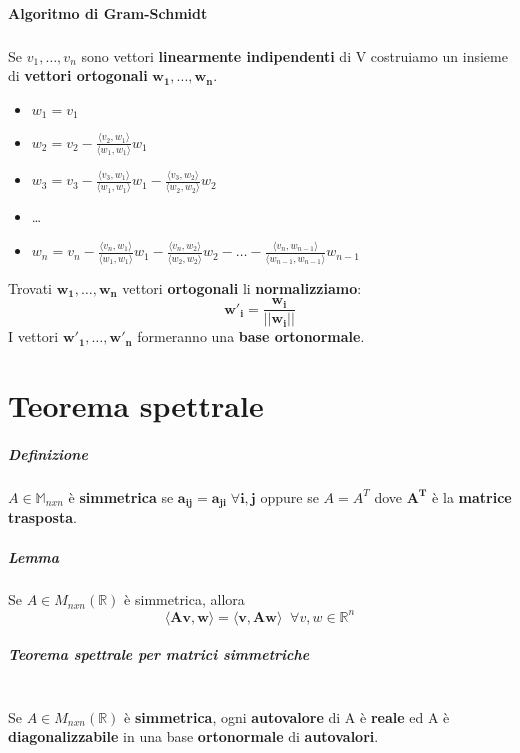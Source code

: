 \documentclass[a4paper, 12pt]{report}
\begin{document}
        \subsubsection{Algoritmo di Gram-Schmidt}
        \paragraph{}Se $v_1,\dots,v_n$ sono vettori \textbf{linearmente indipendenti} di V costruiamo un insieme di \textbf{vettori ortogonali} $\boldsymbol{w_1,...
        ,w_n}$.
        \begin{itemize}
            \item $w_1=v_1$
            \item $w_2=v_2-\frac{\langle v_2,w_1\rangle}{\langle w_1,w_1 \rangle}w_1$
            \item $w_3=v_3-\frac{\langle v_3,w_1\rangle}{\langle w_1,w_1 \rangle}w_1-\frac{\langle v_3,w_2\rangle}{\langle w_2,w_2 \rangle}w_2$
            \item \dots
            \item $w_n=v_n-\frac{\langle v_n,w_1\rangle}{\langle w_1,w_1\rangle}w_1-\frac{\langle v_n,w_2\rangle}{\langle w_2,w_2\rangle}w_2-\dots-\frac{\langle v_{n},w_{n-1}\rangle}{\langle w_{n-1},w_{n-1}\rangle}w_{n-1}$
        \end{itemize}
        Trovati $\boldsymbol{w_1,\dots,w_n}$ vettori \textbf{ortogonali} li \textbf{normalizziamo}:
        $$\boldsymbol{w'_i=\frac{w_i}{||w_i||}}$$
        I vettori $\boldsymbol{w'_1,\dots,w'_n}$ formeranno una \textbf{base ortonormale}.
    \chapter{Teorema spettrale}
        \paragraph{Definizione} $A \in \mathbb{M}_{nxn}$ è \textbf{simmetrica} se $\boldsymbol{a_{ij}=a_{ji} \; \forall i,j}$ oppure se $A=A^T$ dove $\boldsymbol{A^T}$ è la \textbf{matrice trasposta}.
        \paragraph{Lemma} Se $A \in M_{nxn}(\mathbb{R})$ è simmetrica, allora $$\boldsymbol{\langle Av,w \rangle = \langle v,Aw \rangle} \;\; \forall v,w \in \mathbb{R}^n$$
        \paragraph{Teorema spettrale per matrici simmetriche}\mbox{}\\
        Se $A \in M_{nxn}(\mathbb{R})$ è \textbf{simmetrica}, ogni \textbf{autovalore} di A è \textbf{reale} ed A è \textbf{diagonalizzabile} in una base \textbf{ortonormale} di \textbf{autovalori}. 
\end{document}
